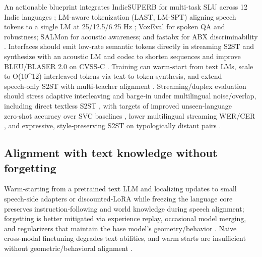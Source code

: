 \documentclass{article}
\begin{document}
An actionable blueprint integrates IndicSUPERB for multi‑task SLU across 12 Indic languages \cite{entry2025indicsuperbspeechprocessinguniversalperf}; LM‑aware tokenization (LAST, LM‑SPT) aligning speech tokens to a single LM at 25/12.5/6.25 Hz \cite{turetzky2024lastlanguagemodelawarespeechtokenization,jo2025lmsptalignedsemanticdistillationspeechto}; VoxEval for spoken QA and robustness; SALMon for acoustic awareness; and fastabx for ABX discriminability \cite{cui2025voxevalbenchmarkingknowledgeunderstandin,maimon2025salmonsuiteacousticlanguagemodelevaluati,poli2025fastabxlibraryefficientcomputationabxdis}. Interfaces should emit low‑rate semantic tokens directly in streaming S2ST and synthesize with an acoustic LM and codec to shorten sequences and improve BLEU/BLASER 2.0 on CVSS‑C \cite{zhao2024textlessstreamingspeechtranslationsemant,jo2025lmsptalignedsemanticdistillationspeechto}. Training can warm‑start from text LMs, scale to O(10^{12}) interleaved tokens via text‑to‑token synthesis, and extend speech‑only S2ST with multi‑teacher alignment \cite{hassid2024textuallypretrainedspeechlanguagemodels,turetzky2024lastlanguagemodelawarespeechtokenization,zeng2024scalingspeechtextpretrainingsyntheticint}. Streaming/duplex evaluation should stress adaptive interleaving and barge‑in under multilingual noise/overlap, including direct textless S2ST \cite{hu2025salmduplexefficientdirectmodelingspeechl,zhao2024textlessstreamingspeechtranslationsemant,wang2023slmbridgethingapbetweenspeechtextfoundat}, with targets of improved unseen‑language zero‑shot accuracy over SVC baselines \cite{hsu2024exploringcontextlearningtextlessspeechla}, lower multilingual streaming WER/CER \cite{li2025transsionmultilingualspeechrecognitionsy}, and expressive, style‑preserving S2ST on typologically distant pairs \cite{huang2023holisticcascadesystembenchmarkhumanevalu}.

\subsection{Alignment with text knowledge without forgetting} \label{subsec:Alignment with text knowledge without forgetting}

Warm‑starting from a pretrained text LLM and localizing updates to small speech‑side adapters or discounted‑LoRA while freezing the language core preserves instruction‑following and world knowledge during speech alignment; forgetting is better mitigated via experience replay, occasional model merging, and regularizers that maintain the base model’s geometry/behavior \cite{hsiao2025analyzingmitigationstrategiescatastrophi,hassid2024textuallypretrainedspeechlanguagemodels,lu2024destaenhancingspeechlanguagemodelsthroug,wang2023slmbridgethingapbetweenspeechtextfoundat}. Naive cross‑modal finetuning degrades text abilities, and warm starts are insufficient without geometric/behavioral alignment \cite{peng2024mslms2stmultitaskspeechlanguagemodeltext}.
\end{document}
